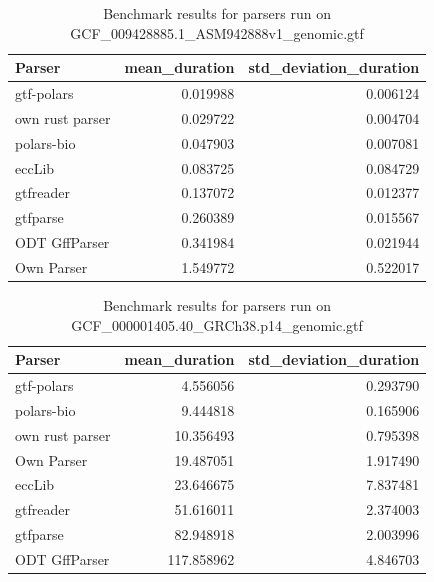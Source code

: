 \begin{table}
\caption{Benchmark results for parsers run on GCF\_009428885.1\_ASM942888v1\_genomic.gtf}
\label{tab:benchmark-GCF_009428885.1_ASM942888v1_genomic.gtf}
\begin{tabular}{lrr}
\toprule
Parser & mean\_duration & std\_deviation\_duration \\
\midrule
gtf-polars & 0.019988 & 0.006124 \\
own rust parser & 0.029722 & 0.004704 \\
polars-bio & 0.047903 & 0.007081 \\
eccLib & 0.083725 & 0.084729 \\
gtfreader & 0.137072 & 0.012377 \\
gtfparse & 0.260389 & 0.015567 \\
ODT GffParser & 0.341984 & 0.021944 \\
Own Parser & 1.549772 & 0.522017 \\
\bottomrule
\end{tabular}
\end{table}

\begin{table}
\caption{Benchmark results for parsers run on GCF\_000001405.40\_GRCh38.p14\_genomic.gtf}
\label{tab:benchmark-GCF_000001405.40_GRCh38.p14_genomic.gtf}
\begin{tabular}{lrr}
\toprule
Parser & mean\_duration & std\_deviation\_duration \\
\midrule
gtf-polars & 4.556056 & 0.293790 \\
polars-bio & 9.444818 & 0.165906 \\
own rust parser & 10.356493 & 0.795398 \\
Own Parser & 19.487051 & 1.917490 \\
eccLib & 23.646675 & 7.837481 \\
gtfreader & 51.616011 & 2.374003 \\
gtfparse & 82.948918 & 2.003996 \\
ODT GffParser & 117.858962 & 4.846703 \\
\bottomrule
\end{tabular}
\end{table}
